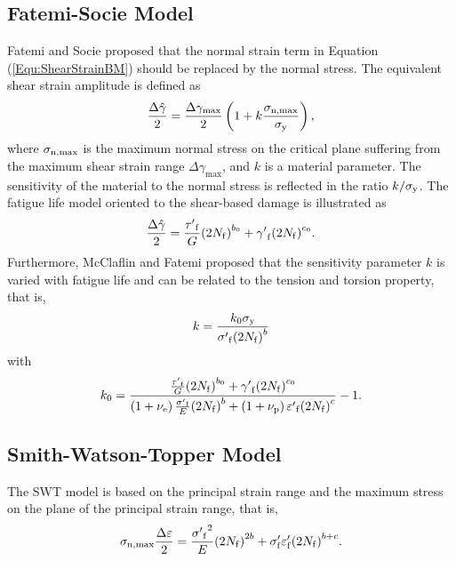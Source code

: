 \documentclass[preprint,5p,twocolumn,11pt,sort&compress]{elsarticle}
\begin{document}
\subsection{Fatemi-Socie Model}
Fatemi and Socie \cite{Fatemi1988} proposed that the normal strain term in Equation (\ref{Equ:ShearStrainBM}) should be replaced by the normal stress.
The equivalent shear strain amplitude is defined as
\begin{equation}
\frac{{\Delta \hat \gamma }}{2} = \frac{{\Delta {\gamma _{\max }}}}{2}\left( {1 + k\frac{{{\sigma _{\rm n,\max}}}}{{{\sigma _{\rm y}}}}} \right),
\end{equation}
where
$\sigma _{\rm n,\max}$ is the maximum normal stress on the critical plane suffering from the maximum shear strain range $\Delta {\gamma _{\max}}$, and $k$ is a material parameter. The sensitivity of the material to the normal stress is reflected in the ratio $k/\sigma _{\rm y}$.
The fatigue life model oriented to the shear-based damage is illustrated as
\begin{equation}
\frac{{\Delta \hat \gamma }}{2} = \frac{{{{\tau '}_{\rm f}}}}{G}{\left( {2{N_{\rm f}}} \right)^{{b_0}}} + {{\gamma '}_{\rm f}}{\left( {2{N_{\rm f}}} \right)^{{c_0}}}.
\end{equation}
Furthermore, McClaflin and Fatemi \cite{McClaflin2004} proposed that the sensitivity parameter $k$ is varied with fatigue life and can be related to the tension and torsion property, that is,
\begin{equation}
k =  \frac{{k_0 {\sigma _{\rm y}}}}{{{{\sigma '}_{\rm f}}{{\left( {2{N_{\rm f}}} \right)}^b}}}
\end{equation}
with
\[
k_0 =  {\frac{{\frac{{{{\tau '}_{\rm f}}}}{G}{{\left( {2{N_{\rm f}}} \right)}^{{b_0}}} + {{\gamma '}_{\rm f}}{{\left( {2{N_{\rm f}}} \right)}^{{c_0}}}}}{{\left( {1 + {\nu _{\rm e}}} \right)\frac{{{{\sigma '}_{\rm f}}}}{E}{{\left( {2{N_{\rm f}}} \right)}^b} + \left( {1 + {\nu _{\rm p}}} \right){{\varepsilon '}_{\rm f}}{{\left( {2{N_{\rm f}}} \right)}^c}}} - 1} .
\]


\subsection{Smith-Watson-Topper Model}
The SWT model \cite{smith1970stress} is based on the principal strain range and the maximum stress on the plane of the principal
strain range, that is,
\[
{\sigma _{\rm n, \max}}\frac{{\Delta \varepsilon }}{2} = \frac{{{{\sigma '}_{\rm f}}^2}}{E}{\left( {2{N_{\rm f}}} \right)^{2b}} + {\sigma '_{\rm f}}{\varepsilon '_{\rm f}}{\left( {2{N_{\rm f}}} \right)^{b + c}}.
\]
\end{document}
